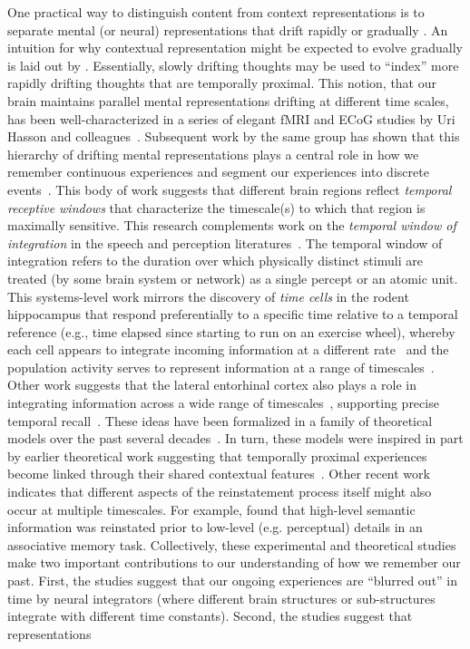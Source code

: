 \documentclass{article}
\begin{document}
One practical way to distinguish content from context representations is to separate mental (or neural) representations that drift rapidly \citep[content;][]{PolyEtal05a, MannEtal12} or gradually \citep[context;][]{PolyEtal05a, MannEtal11, HowaEtal12, LohnEtal18, LongKaha18, FolkEtal18}.  An intuition for why contextual representation might be expected to evolve gradually is laid out by \cite{PolyKaha08}.  Essentially, slowly drifting thoughts may be used to ``index'' more rapidly drifting thoughts that are temporally proximal.  This notion, that our brain maintains parallel mental representations drifting at different time scales, has been well-characterized in a series of elegant fMRI and ECoG studies by Uri Hasson and colleagues~\citep{HassEtal08, LernEtal11, HoneEtal12a, AlyEtal18}.  Subsequent work by the same group has shown that this hierarchy of drifting mental representations plays a central role in how we remember continuous experiences and segment our experiences into discrete events~\citep{BaldEtal17}.  This body of work suggests that different brain regions reflect \textit{temporal receptive windows} that characterize the timescale(s) to which that region is maximally sensitive.  This research complements work on the \textit{temporal window of integration} in the speech and perception literatures~\citep[e.g.,][]{ViemWake91, GautEtal12, vanWEtal07}.  The temporal window of integration refers to the duration over which physically distinct stimuli are treated (by some brain system or network) as a single percept or an atomic unit.  This systems-level work mirrors the discovery of \textit{time cells} in the rodent hippocampus that respond preferentially to a specific time relative to a temporal reference (e.g., time elapsed since starting to run on an exercise wheel), whereby each cell appears to integrate incoming information at a different rate~\citep{PastEtal08, MacDEtal11} and the population activity serves to represent information at a range of timescales~\citep{MauEtal18}. Other work suggests that the lateral entorhinal cortex also plays a role in integrating information across a wide range of timescales~\citep{TsaoEtal18}, supporting precise temporal recall~\citep{MontEtal19}.  These ideas have been formalized in a family of theoretical models over the past several decades~\citep{HowaKaha02a, DianEtal07, SedeEtal08, PolyEtal09, ShanEtal09, ShanHowa10, ShanHowa12, HowaEtal14, Rang18}.  In turn, these models were inspired in part by earlier theoretical work suggesting that temporally proximal experiences become linked through their shared contextual features~\citep{Este55a,AtkiShif68}.  Other recent work indicates that different aspects of the reinstatement process itself might also occur at multiple timescales.  For example, \cite{LindEtal19} found that high-level semantic information was reinstated prior to low-level (e.g. perceptual) details in an associative memory task.  Collectively, these experimental and theoretical studies make two important contributions to our understanding of how we remember our past.  First, the studies suggest that our ongoing experiences are ``blurred out'' in time by neural integrators (where different brain structures or sub-structures integrate with different time constants).  Second, the studies suggest that representations 
\end{document}
